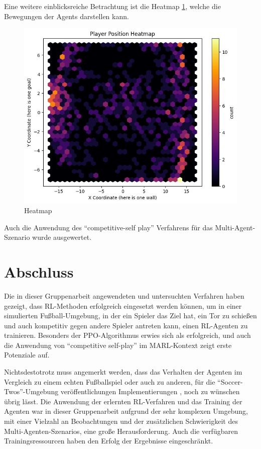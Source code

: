 \documentclass[twocolumn]{webofc}
\begin{document}
Eine weitere einblicksreiche Betrachtung ist die Heatmap \ref{fig:bild3}, welche die Bewegungen der Agents darstellen kann.
\begin{figure}[h]
	\centering
	\includegraphics[width=\columnwidth]{img/example3.jpeg}
	\caption{Heatmap}
	\label{fig:bild3}
\end{figure}

Auch die Anwendung des \enquote{competitive-self play} Verfahrens für das Multi-Agent-Szenario wurde ausgewertet.



\section{Abschluss} \label{sec-3}

Die in dieser Gruppenarbeit angewendeten und untersuchten Verfahren haben gezeigt, dass \ac{RL}-Methoden erfolgreich eingesetzt werden können, um in einer simulierten Fußball-Umgebung, in der ein Spieler das Ziel hat, ein Tor zu schießen und auch kompetitiv gegen andere Spieler antreten kann, einen \ac{RL}-Agenten zu trainieren. Besonders der \ac{PPO}-Algorithmus erwies sich als erfolgreich, und auch die Anwendung von \enquote{competitive self-play} im \ac{MARL}-Kontext zeigt erste Potenziale auf.

Nichtsdestotrotz muss angemerkt werden, dass das Verhalten der Agenten im Vergleich zu einem echten Fußballspiel oder auch zu anderen, für die \enquote{Soccer-Twos}-Umgebung veröffentlichungen Implementierungen \cite{todo}, noch zu wünschen übrig lässt. Die Anwendung der erlernten \ac{RL}-Verfahren und das Training der Agenten war in dieser Gruppenarbeit aufgrund der sehr komplexen Umgebung, mit einer Vielzahl an Beobachtungen und der zusätzlichen Schwierigkeit des Multi-Agenten-Szenarios, eine große Herausforderung. Auch die verfügbaren Trainingsressourcen haben den Erfolg der Ergebnisse eingeschränkt.
\end{document}
